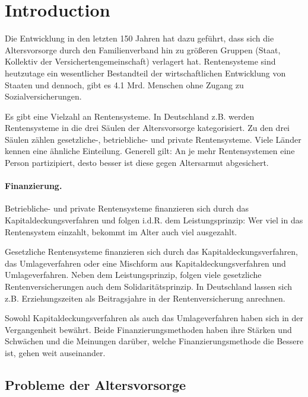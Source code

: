 \section{Introduction}

Die Entwicklung in den letzten 150 Jahren hat dazu geführt, dass sich die Altersvorsorge durch den Familienverband hin zu größeren Gruppen (Staat, Kollektiv der Versichertengemeinschaft) verlagert hat. Rentensysteme sind heutzutage ein wesentlicher Bestandteil der wirtschaftlichen Entwicklung von Staaten und dennoch, gibt es 4.1 Mrd. Menschen ohne Zugang zu Sozialversicherungen.\cite{noauthor_universal_2017}

Es gibt eine Vielzahl an Rentensysteme. In Deutschland z.B. werden Rentensysteme in die drei Säulen der Altersvorsorge kategorisiert. Zu den drei Säulen zählen gesetzliche-, betriebliche- und private Rentensysteme. Viele Länder kennen eine ähnliche Einteilung. Generell gilt: An je mehr Rentensystemen eine Person partizipiert, desto besser ist diese gegen Altersarmut abgesichert.

\paragraph{Finanzierung.} Betriebliche- und private Rentensysteme finanzieren sich durch das Kapitaldeckungsverfahren und folgen i.d.R. dem Leistungsprinzip: Wer viel in das Rentensystem einzahlt, bekommt im Alter auch viel ausgezahlt.

Gesetzliche Rentensysteme finanzieren sich durch das Kapitaldeckungsverfahren, das Umlageverfahren oder eine Mischform aus Kapitaldeckungsverfahren und Umlageverfahren. Neben dem Leistungsprinzip, folgen viele gesetzliche Rentenversicherungen auch dem Solidaritätsprinzip. In Deutschland lassen sich z.B. Erziehungszeiten als Beitragsjahre in der Rentenversicherung anrechnen.

Sowohl Kapitaldeckungsverfahren als auch das Umlageverfahren haben sich in der Vergangenheit bewährt. Beide Finanzierungsmethoden haben ihre Stärken und Schwächen und die Meinungen darüber, welche Finanzierungsmethode die Bessere ist, gehen weit auseinander.


\subsection{Probleme der Altersvorsorge}

